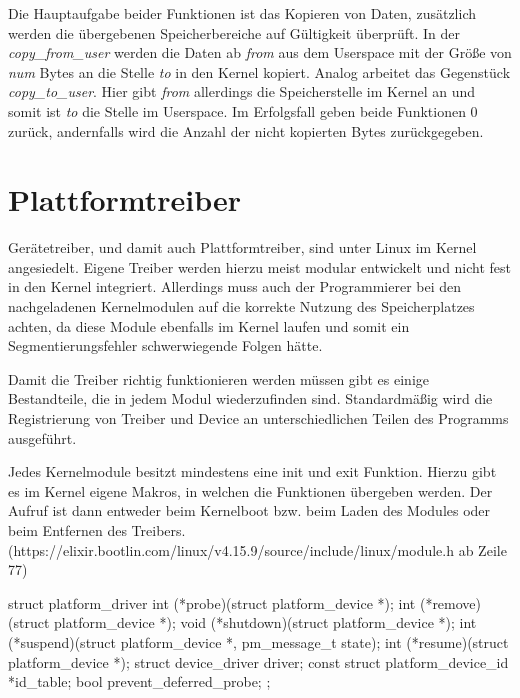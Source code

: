 Die Hauptaufgabe beider Funktionen ist das Kopieren von Daten, zusätzlich werden die übergebenen Speicherbereiche auf Gültigkeit überprüft. 
In der \textit{copy\_from\_user} werden die Daten ab \textit{from} aus dem Userspace mit der Größe von \textit{num} Bytes an die Stelle \textit{to} in den Kernel kopiert.
Analog arbeitet das Gegenstück \textit{copy\_to\_user}. Hier gibt \textit{from} allerdings die Speicherstelle im Kernel an und somit ist \textit{to} die Stelle im Userspace.
Im Erfolgsfall geben beide Funktionen 0 zurück, andernfalls wird die Anzahl der nicht kopierten Bytes zurückgegeben. \citep[S. 250f]{schroder2009embedded}


\section{Plattformtreiber}\label{sec:plat_t}
Gerätetreiber, und damit auch Plattformtreiber, sind unter Linux im Kernel angesiedelt. Eigene Treiber werden hierzu meist modular entwickelt und nicht fest in den Kernel integriert. Allerdings muss auch der Programmierer bei den nachgeladenen Kernelmodulen auf die korrekte Nutzung des Speicherplatzes achten, da diese Module ebenfalls im Kernel laufen und somit ein Segmentierungsfehler schwerwiegende Folgen hätte. \citep[S. 231ff.]{schroder2009embedded}

Damit die Treiber richtig funktionieren werden müssen gibt es einige Bestandteile, die in jedem Modul wiederzufinden sind. Standardmäßig wird die Registrierung von Treiber und Device an unterschiedlichen Teilen des Programms ausgeführt. \cite{corbetplatform} 

Jedes Kernelmodule besitzt mindestens eine init und exit Funktion. Hierzu gibt es im Kernel eigene Makros, in welchen die Funktionen übergeben werden. Der Aufruf ist dann entweder beim Kernelboot bzw. beim Laden des Modules oder beim Entfernen des Treibers.
(https://elixir.bootlin.com/linux/v4.15.9/source/include/linux/module.h ab Zeile 77)

\begin{minipage}{\textwidth}
	\begin{bash}
struct platform_driver {
	int (*probe)(struct platform_device *);
	int (*remove)(struct platform_device *);
	void (*shutdown)(struct platform_device *);
	int (*suspend)(struct platform_device *, pm_message_t state);
	int (*resume)(struct platform_device *);
	struct device_driver driver;
	const struct platform_device_id *id_table;
	bool prevent_deferred_probe;
};
	\end{bash}
\end{minipage}

